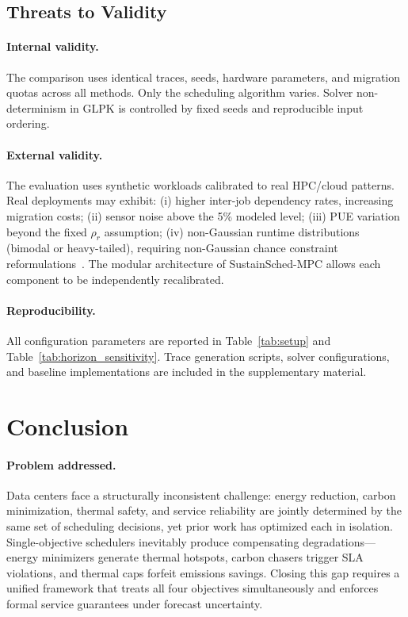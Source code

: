 \documentclass[a4paper,fleqn]{cas-dc}
\begin{document}
\subsection{Threats to Validity}
\label{sec:threats}

\paragraph{Internal validity.}
The comparison uses identical traces, seeds, hardware parameters, and migration quotas across all methods. Only the scheduling algorithm varies. Solver non-determinism in GLPK is controlled by fixed seeds and reproducible input ordering.

\paragraph{External validity.}
The evaluation uses synthetic workloads calibrated to real HPC/cloud patterns. Real deployments may exhibit: (i) higher inter-job dependency rates, increasing migration costs; (ii) sensor noise above the 5\% modeled level; (iii) PUE variation beyond the fixed $\rho_r$ assumption; (iv) non-Gaussian runtime distributions (bimodal or heavy-tailed), requiring non-Gaussian chance constraint reformulations~\cite{ref-nemirovski06}. The modular architecture of SustainSched-MPC allows each component to be independently recalibrated.

\paragraph{Reproducibility.}
All configuration parameters are reported in Table~\ref{tab:setup} and Table~\ref{tab:horizon_sensitivity}. Trace generation scripts, solver configurations, and baseline implementations are included in the supplementary material.
\FloatBarrier
\section{Conclusion}
\label{sec:conclusion}

\paragraph{Problem addressed.}
Data centers face a structurally inconsistent challenge: energy reduction, carbon minimization, thermal safety, and service reliability are jointly determined by the same set of scheduling decisions, yet prior work has optimized each in isolation. Single-objective schedulers inevitably produce compensating degradations---energy minimizers generate thermal hotspots, carbon chasers trigger SLA violations, and thermal caps forfeit emissions savings. Closing this gap requires a unified framework that treats all four objectives simultaneously and enforces formal service guarantees under forecast uncertainty.
\end{document}
